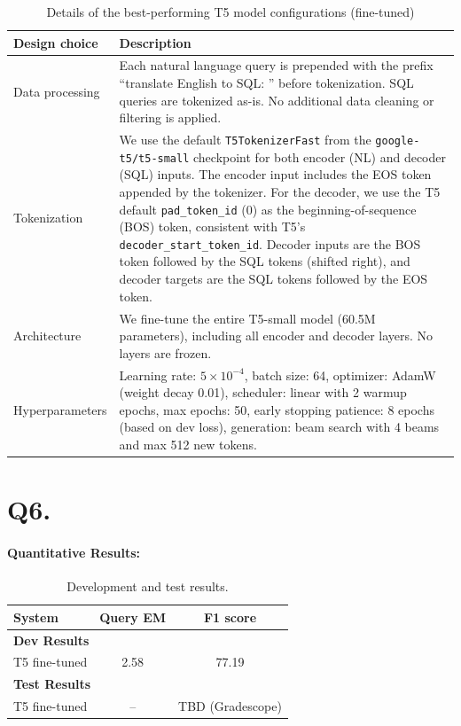 \documentclass{article}
\begin{document}
\begin{table}[h!]
\centering
\begin{tabular}{p{3.5cm}p{10cm}}
\toprule
Design choice & Description \\
\midrule
Data processing & Each natural language query is prepended with the prefix ``translate English to SQL: '' before tokenization. SQL queries are tokenized as-is. No additional data cleaning or filtering is applied. \\
Tokenization & We use the default \texttt{T5TokenizerFast} from the \texttt{google-t5/t5-small} checkpoint for both encoder (NL) and decoder (SQL) inputs. The encoder input includes the EOS token appended by the tokenizer. For the decoder, we use the T5 default \texttt{pad\_token\_id} (0) as the beginning-of-sequence (BOS) token, consistent with T5's \texttt{decoder\_start\_token\_id}. Decoder inputs are the BOS token followed by the SQL tokens (shifted right), and decoder targets are the SQL tokens followed by the EOS token. \\
Architecture & We fine-tune the entire T5-small model (60.5M parameters), including all encoder and decoder layers. No layers are frozen. \\
Hyperparameters & Learning rate: $5 \times 10^{-4}$, batch size: 64, optimizer: AdamW (weight decay 0.01), scheduler: linear with 2 warmup epochs, max epochs: 50, early stopping patience: 8 epochs (based on dev loss), generation: beam search with 4 beams and max 512 new tokens. \\
\bottomrule
\end{tabular}
\caption{Details of the best-performing T5 model configurations (fine-tuned)}
\label{tab:t5_results_ft}
\end{table}






\section*{Q6. }
\label{Q6}

\paragraph{Quantitative Results:}
\begin{table}[h!]
\centering
\begin{tabular}{lcc}
  \toprule
  System & Query EM & F1 score\\
  \midrule
  \multicolumn{3}{l}{\textbf{Dev Results}} \\
  \midrule
  T5 fine-tuned & 2.58 & 77.19 \\

  \midrule
  \multicolumn{3}{l}{\textbf{Test Results}} \\
  \midrule
  T5 fine-tuned & -- & TBD (Gradescope) \\
  \bottomrule
\end{tabular}
\caption{Development and test results.}
\label{tab:results}
\end{table}
\end{document}
